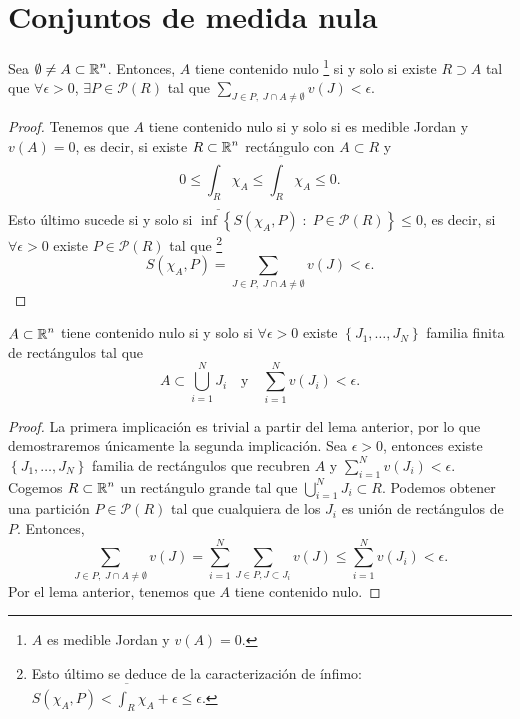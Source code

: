 \section{Conjuntos de medida nula}
\begin{lema}
Sea $\displaystyle \emptyset \neq A \subset \mathbb{R}^{n} $. Entonces, $\displaystyle A $ tiene contenido nulo \footnote{$\displaystyle A $ es medible Jordan y $\displaystyle v\left(A\right) = 0 $.} si y solo si existe $\displaystyle R \supset A $ tal que $\displaystyle \forall \epsilon > 0 $, $\displaystyle \exists P \in \mathcal{P}\left(R\right) $ tal que $\displaystyle \sum^{}_{J \in P, \; J \cap A \neq \emptyset}v\left(J\right) < \epsilon  $.
\end{lema}
\begin{proof}
Tenemos que $\displaystyle A $ tiene contenido nulo si y solo si es medible Jordan y $\displaystyle v\left(A\right) = 0 $, es decir, si existe $\displaystyle R \subset \mathbb{R}^{n} $ rectángulo con $\displaystyle A \subset R $ y 
\[0 \leq \underline{\int _{R} }\chi_{A} \leq \overline{\int _{R} }\chi_{A} \leq 0 .\]
Esto último sucede si y solo si $\displaystyle \inf \left\{ S\left(\chi_{A}, P\right)\; : \; P \in \mathcal{P}\left(R\right)\right\} \leq 0 $, es decir, si $\displaystyle \forall \epsilon > 0 $ existe $\displaystyle P \in \mathcal{P} \left(R\right) $ tal que \footnote{Esto último se deduce de la caracterización de ínfimo: $\displaystyle S\left(\chi_{A}, P\right)< \overline{\int _{R} }\chi_{A} + \epsilon \leq \epsilon  $.} 
\[ S\left(\chi_{A}, P\right) = \sum_{J \in P, \; J \cap A \neq \emptyset}v\left(J\right) < \epsilon  .\]
\end{proof}
\begin{prop}
	$\displaystyle A \subset \mathbb{R}^{n} $ tiene contenido nulo si y solo si $\displaystyle \forall \epsilon > 0 $ existe $\displaystyle \left\{ J_{1}, \ldots, J_{N}\right\}  $ familia finita de rectángulos tal que 
	\[A \subset \bigcup_{i =1}^{N}J_{i}\quad \text{y} \quad \sum^{N}_{i =1} v\left(J_{i}\right) < \epsilon  .\]
\end{prop}
\begin{proof}
	La primera implicación es trivial a partir del lema anterior, por lo que demostraremos únicamente la segunda implicación. Sea $\displaystyle \epsilon > 0 $, entonces existe $\displaystyle \left\{ J_{1}, \ldots, J_{N}\right\}  $ familia de rectángulos que recubren $\displaystyle A $ y $\displaystyle \sum^{N}_{i = 1}v\left(J_{i}\right)< \epsilon  $. Cogemos $\displaystyle R \subset \mathbb{R}^{n} $ un rectángulo grande tal que $\displaystyle \bigcup_{i = 1}^{N}J_{i} \subset R $. 
	Podemos obtener una partición $\displaystyle P\in \mathcal{P}\left(R\right) $ tal que cualquiera de los $\displaystyle J_{i} $ es unión de rectángulos de $\displaystyle P $. Entonces,
	\[\sum_{J \in P, \; J \cap A \neq \emptyset}v\left(J\right) = \sum^{N}_{i = 1}\sum_{J \in P, J \subset J_{i}}v\left(J\right) \leq \sum^{N}_{i = 1}v\left(J_{i}\right) < \epsilon  .\]
	Por el lema anterior, tenemos que $\displaystyle A $ tiene contenido nulo.
\end{proof}
